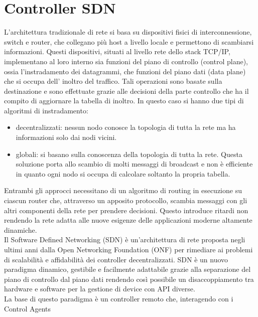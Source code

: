 \chapter{Controller SDN}
\label{ch:SDN}

L'architettura tradizionale di rete si basa su dispositivi fisici di interconnessione, switch e router, che collegano più host a livello locale e permettono di scambiarsi informazioni.
Questi dispositivi, situati al livello rete dello stack TCP/IP, implementano al loro interno sia funzioni del piano di controllo (control plane),
ossia l'instradamento dei datagrammi, che funzioni del piano dati (data plane) che si occupa dell' inoltro del traffico. Tali operazioni sono basate sulla destinazione
e sono effettuate grazie alle decisioni della parte controllo che ha il compito di aggiornare la tabella di inoltro. 
In questo caso si hanno due tipi di algoritmi di instradamento: 
\begin{itemize}
\item decentralizzati: nessun nodo conosce la topologia di tutta la rete ma ha informazioni solo dai nodi vicini. 
\item globali: si basano sulla conoscenza della topologia di tutta la rete. Questa soluzione
porta allo scambio di molti messaggi di broadcast e non è efficiente in quanto ogni
nodo si occupa di calcolare soltanto la propria tabella.
\end{itemize}
Entrambi gli approcci necessitano di un algoritmo di routing in esecuzione su ciascun router che, attraverso un apposito protocollo, 
scambia messaggi con gli altri componenti della rete per prendere decisioni. Questo introduce ritardi non rendendo la rete adatta alle nuove esigenze delle applicazioni moderne altamente dinamiche.
\\Il Software Defined Networking (SDN) è un'architettura di rete proposta negli ultimi anni dalla Open Networking Foundation (ONF) \cite{ONF} per rimediare ai problemi di scalabilità e affidabilità dei controller decentralizzati.
SDN è un nuovo paradigma dinamico, gestibile e facilmente adattabile grazie alla separazione del piano di controllo dal piano dati rendendo così possibile un disaccoppiamento tra hardware e software per la gestione di device con API diverse.
\\La base di questo paradigma è un controller remoto che, interagendo con i Control Agents
